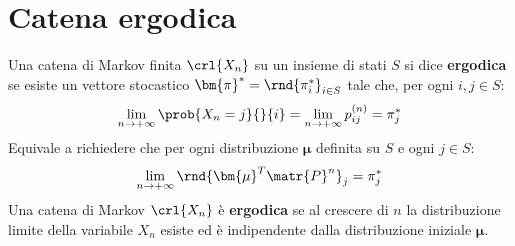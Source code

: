 \documentclass[\main/main.tex]{subfiles}
\begin{document}
\section{Catena ergodica}
\begin{theorem}
  Una catena di Markov finita \(\crl{X_n}\) su un insieme di stati \(S\) si dice \textbf{ergodica} se esiste un vettore stocastico \(\bm{\pi}^* = \rnd{\pi_i^*}_{i \in S}\) tale che, per ogni \(i, j \in S\):
  \[
    \lim_{n \rightarrow +\infty} \prob{X_n = j}{}{i} = \lim_{n \rightarrow +\infty} p^{(n)}_{ij} = \pi_{j}^*
  \]
  Equivale a richiedere che per ogni distribuzione \(\bm{\mu} \) definita su \(S\) e ogni \(j \in S\):
  \[
    \lim_{n \rightarrow +\infty} \rnd{\bm{\mu}^T \matr{P}^n}_{j} = \pi_{j}^*
  \]
  Una catena di Markov \(\crl{X_n}\) è \textbf{ergodica} se al crescere di \(n\) la distribuzione limite della variabile \(X_n\) esiste ed è indipendente dalla distribuzione iniziale \(\bm{\mu} \).
\end{theorem}
\end{document}
